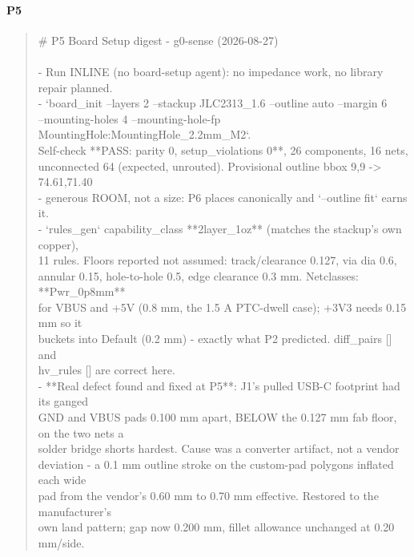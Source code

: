 \documentclass[11pt,a4paper]{article}
\begin{document}
\paragraph*{P5}
\begin{quote}\small\ttfamily\raggedright
\# P5 Board Setup digest - g0-sense (2026-08-27)\\
~\\
- Run INLINE (no board-setup agent): no impedance work, no library repair planned.\\
- `board\_init --layers 2 --stackup JLC2313\_1.6 --outline auto --margin 6\\
  --mounting-holes 4 --mounting-hole-fp MountingHole:MountingHole\_2.2mm\_M2`.\\
  Self-check {*}{*}PASS: parity 0, setup\_violations 0{*}{*}, 26 components, 16 nets,\\
  unconnected 64 (expected, unrouted). Provisional outline bbox 9,9 -\textgreater{} 74.61,71.40\\
  - generous ROOM, not a size: P6 places canonically and `--outline fit` earns it.\\
- `rules\_gen` capability\_class {*}{*}2layer\_1oz{*}{*} (matches the stackup's own copper),\\
  11 rules. Floors reported not assumed: track/clearance 0.127, via dia 0.6,\\
  annular 0.15, hole-to-hole 0.5, edge clearance 0.3 mm. Netclasses: {*}{*}Pwr\_0p8mm{*}{*}\\
  for VBUS and +5V (0.8 mm, the 1.5 A PTC-dwell case); +3V3 needs 0.15 mm so it\\
  buckets into Default (0.2 mm) - exactly what P2 predicted. diff\_pairs {[}{]} and\\
  hv\_rules {[}{]} are correct here.\\
- {*}{*}Real defect found and fixed at P5{*}{*}: J1's pulled USB-C footprint had its ganged\\
  GND and VBUS pads 0.100 mm apart, BELOW the 0.127 mm fab floor, on the two nets a\\
  solder bridge shorts hardest. Cause was a converter artifact, not a vendor\\
  deviation - a 0.1 mm outline stroke on the custom-pad polygons inflated each wide\\
  pad from the vendor's 0.60 mm to 0.70 mm effective. Restored to the manufacturer's\\
  own land pattern; gap now 0.200 mm, fillet allowance unchanged at 0.20 mm/side.\\

\end{quote}
\end{document}
